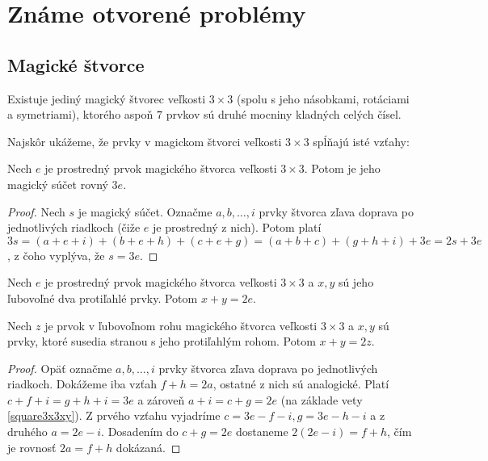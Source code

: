 \chapter{Známe otvorené problémy}

\label{kap:openproblems} %

\section{Magické štvorce}

\begin{hypothesis} Existuje jediný magický štvorec veľkosti $3 \times 3$ (spolu s jeho násobkami, rotáciami a symetriami), ktorého aspoň $7$ prvkov sú druhé mocniny kladných celých čísel.
\end{hypothesis}

Najskôr ukážeme, že prvky v magickom štvorci veľkosti $3 \times 3$ spĺňajú isté vzťahy:

\begin{theorem} Nech $e$ je prostredný prvok magického štvorca veľkosti $3 \times 3$. Potom je jeho magický súčet rovný $3e$.
\end{theorem}

\begin{proof} Nech $s$ je magický súčet. Označme $a, b, \dots , i$ prvky štvorca zľava doprava po jednotlivých riadkoch (čiže $e$ je prostredný z nich). Potom platí $3s = (a + e + i) + (b + e + h) + (c + e + g) = (a + b + c) + (g + h + i) + 3e = 2s + 3e$, z čoho vyplýva, že $s = 3e$.
\end{proof}

\begin{consequence}
\label{square3x3xy}
Nech $e$ je prostredný prvok magického štvorca veľkosti $3 \times 3$ a $x,y$ sú jeho ľubovoľné dva protiľahlé prvky. Potom $x + y = 2e$.
\end{consequence}

\begin{consequence}
\label{square3x3afh}
Nech $z$ je prvok v ľubovoľnom rohu magického štvorca veľkosti $3 \times 3$ a $x,y$ sú prvky, ktoré susedia stranou s jeho protiľahlým rohom. Potom $x + y = 2z$.
\end{consequence}

\begin{proof} Opäť označme $a, b, \dots , i$ prvky štvorca zľava doprava po jednotlivých riadkoch. Dokážeme iba vzťah $f + h = 2a$, ostatné z nich sú analogické. Platí $c + f + i = g + h + i = 3e$ a zároveň $a + i = c + g = 2e$ (na základe vety \ref{square3x3xy}). Z prvého vzťahu vyjadríme $c = 3e - f - i, g = 3e - h - i$ a z druhého $a = 2e - i$. Dosadením do $c + g = 2e$ dostaneme $2(2e - i) = f + h$, čím je rovnosť $2a = f + h$ dokázaná.
\end{proof}

